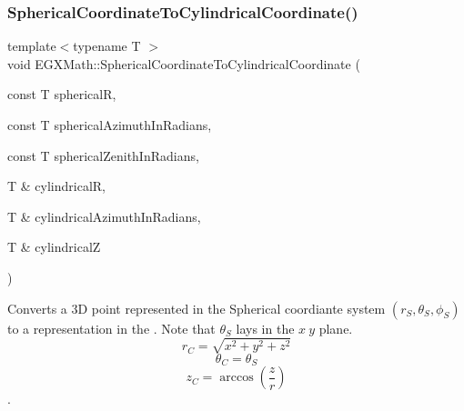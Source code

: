 \subsubsection{\texorpdfstring{Spherical\+Coordinate\+To\+Cylindrical\+Coordinate()}{SphericalCoordinateToCylindricalCoordinate()}}
{\footnotesize\ttfamily template$<$typename T $>$ \\
void E\+G\+X\+Math\+::\+Spherical\+Coordinate\+To\+Cylindrical\+Coordinate (\begin{DoxyParamCaption}\item[{const T}]{sphericalR,  }\item[{const T}]{spherical\+Azimuth\+In\+Radians,  }\item[{const T}]{spherical\+Zenith\+In\+Radians,  }\item[{T \&}]{cylindricalR,  }\item[{T \&}]{cylindrical\+Azimuth\+In\+Radians,  }\item[{T \&}]{cylindricalZ }\end{DoxyParamCaption})}



Converts a 3D point represented in the Spherical coordiante system $(r_S,\theta_S,\phi_S)$ to a representation in the . Note that $\theta_S$ lays in the $x\ y$ plane. \[ r_C = \sqrt{x^2+y^2+z^2} \] \[ \theta_C = \theta_S \] \[ z_C = \arccos(\frac{z}{r}) \]. 

